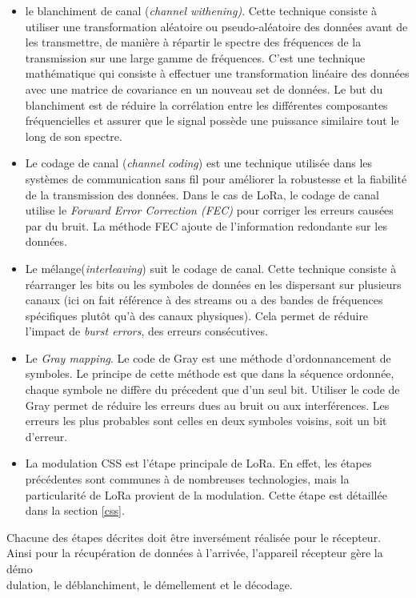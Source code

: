 \begin{itemize}
\item le blanchiment de canal (\textit{channel withening)}.
Cette technique consiste à utiliser une transformation aléatoire ou pseudo-aléatoire des données avant de les transmettre, de manière à répartir le spectre des fréquences de la transmission sur une large gamme de fréquences. C'est une technique mathématique qui consiste à effectuer une transformation linéaire des données avec une matrice de covariance en un nouveau set de données. Le but du blanchiment est de réduire la corrélation entre les différentes composantes fréquencielles et assurer que le signal possède une puissance similaire tout le long de son spectre.
\item Le codage de canal (\textit{channel coding}) est une technique utilisée dans les systèmes de communication sans fil pour améliorer la robustesse et la fiabilité de la transmission des données. Dans le cas de LoRa, le codage de canal utilise le \textit{Forward Error Correction (FEC)} pour corriger les erreurs causées par du bruit. La méthode FEC ajoute de l'information redondante sur les données.
\item Le mélange(\textit{interleaving}) suit le codage de canal.  
Cette technique consiste à réarranger les bits ou les symboles de données en les dispersant sur plusieurs canaux (ici on fait référence à des streams ou a des bandes de fréquences spécifiques plutôt qu'à des canaux physiques). Cela permet de réduire l'impact de \textit{burst errors}, des erreurs consécutives.
\item Le \textit{Gray mapping}. Le code de Gray est une méthode d'ordonnancement de symboles. Le principe de cette méthode est que dans la séquence ordonnée, chaque symbole ne diffère du précedent que d'un seul bit. Utiliser le code de Gray permet de réduire les erreurs dues au bruit ou aux interférences. Les erreurs les plus probables sont celles en deux symboles voisins, soit un bit d'erreur.
\item La modulation CSS est l'étape principale de LoRa. En effet, les étapes précédentes sont communes à de nombreuses technologies, mais la particularité de LoRa provient de la modulation. Cette étape est détaillée dans la section \ref{css}.
\end{itemize}

\vspace{0.1cm}

Chacune des étapes décrites doit être inversément réalisée pour le récepteur. Ainsi pour la récupération de données à l'arrivée, l'appareil récepteur gère la démo \\ dulation, le déblanchiment, le démellement et le décodage.

